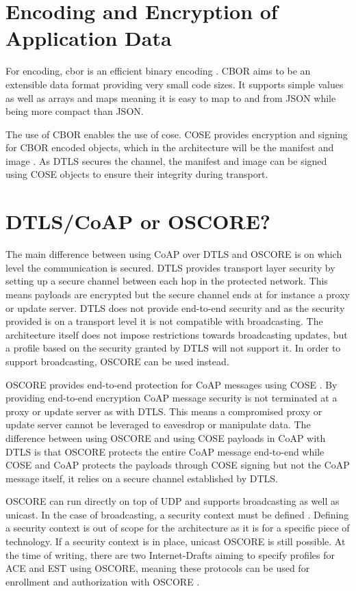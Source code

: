 \documentclass[0-thesis.tex]{subfiles}
\begin{document}
\section{Encoding and Encryption of Application Data}
\label{sec:encoding-encryption}
For encoding, \gls{cbor} is an efficient binary encoding \parencite{rfc7049}. CBOR aims to
be an extensible data format providing very small code sizes. It supports simple values as
well as arrays and maps meaning it is easy to map to and from JSON while being more
compact than JSON. 

The use of CBOR enables the use of \gls{cose}. COSE provides encryption and signing for
CBOR encoded objects, which in the architecture will be the manifest and image
\parencite{rfc8152}. As DTLS secures the channel, the manifest and image can be signed
using COSE objects to ensure their integrity during transport. 

\section{DTLS/CoAP or OSCORE?}
\label{sec:dtls-coap-or-oscore}
The main difference between using CoAP over DTLS and OSCORE is on which level the
communication is secured. DTLS provides transport layer security by setting up a secure
channel between each hop in the protected network. This means payloads are encrypted but
the secure channel ends at for instance a proxy or update server. DTLS does not provide
end-to-end security and as the security provided is on a transport level it is not
compatible with broadcasting. The architecture itself does not impose restrictions towards
broadcasting updates, but a profile based on the security granted by DTLS will not support
it. In order to support broadcasting, OSCORE can be used instead.

OSCORE provides end-to-end protection for CoAP messages using COSE \parencite{oscore}. By
providing end-to-end encryption CoAP message security is not terminated at a proxy or
update server as with DTLS. This means a compromised proxy or update server cannot be
leveraged to eavesdrop or manipulate data. The difference between using OSCORE and using
COSE payloads in CoAP with DTLS is that OSCORE protects the entire CoAP message end-to-end
while COSE and CoAP protects the payloads through COSE signing but not the CoAP message
itself, it relies on a secure channel established by DTLS.

OSCORE can run directly on top of UDP and supports broadcasting as well as unicast. In the
case of broadcasting, a security context must be defined \parencite{oscore-group}.
Defining a security context is out of scope for the architecture as it is for a specific
piece of technology. If a security context is in place, unicast OSCORE is still possible.
At the time of writing, there are two Internet-Drafts aiming to specify profiles for ACE
and EST using OSCORE, meaning these protocols can be used for enrollment and authorization
with OSCORE \parencite{ace-oscore, est-oscore}.
\end{document}
